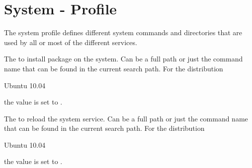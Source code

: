 \label{sec:system_profile}
\section{System - Profile}

The system profile defines different system commands and directories
that are used by all or most of the different services.


The  to install package on the system. Can be a full path or
just the command name that can be found in the current search path. 
For the distribution
\begin{inparaitem}
\item[\TheDistribution{ubuntu}] Ubuntu 10.04
\end{inparaitem}
the value is set to .


The  to reload the system service. Can be a full path or
just the command name that can be found in the current search path.
For the distribution
\begin{inparaitem}
\item[\TheDistribution{ubuntu}] Ubuntu 10.04
\end{inparaitem}
the value is set to .

